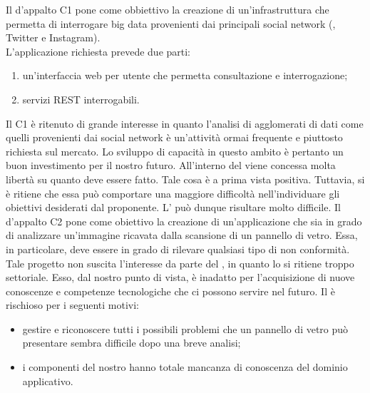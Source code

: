 			Il  d'appalto C1 pone come obbiettivo la creazione di un'infrastruttura che permetta di interrogare big data provenienti dai principali social network (, Twitter e Instagram).\\
			L'applicazione richiesta prevede due parti:
			\begin{enumerate}
				\item un'interfaccia web per utente che permetta consultazione e interrogazione;
				\item servizi REST interrogabili.
			\end{enumerate}
			Il  C1 è ritenuto di grande interesse in quanto l'analisi di agglomerati di dati come quelli provenienti dai social network è un'attività ormai frequente e piuttosto richiesta sul mercato. Lo sviluppo di capacità in questo ambito è pertanto un buon investimento per il nostro futuro.
		All'interno del  viene concessa molta libertà su quanto deve essere fatto. Tale cosa è a prima vista positiva. Tuttavia, si è ritiene che essa può comportare una maggiore difficoltà nell'individuare gli obiettivi desiderati dal proponente. L' può dunque risultare molto difficile.
			Il  d'appalto C2 pone come obiettivo la creazione di un'applicazione che sia in grado di analizzare un'immagine ricavata dalla scansione di un pannello di vetro. Essa, in particolare, deve essere in grado di rilevare qualsiasi tipo di non conformità.
			Tale progetto non suscita l'interesse da parte del , in quanto lo si ritiene troppo settoriale. Esso, dal nostro punto di vista, è inadatto per l'acquisizione di nuove conoscenze e competenze tecnologiche che ci possono servire nel futuro.
			Il  è rischioso per i seguenti motivi:
			\begin{itemize}
				\item gestire e riconoscere tutti i possibili problemi che un pannello di vetro può presentare sembra difficile dopo una breve analisi;
				\item i componenti del nostro  hanno totale mancanza di conoscenza del dominio applicativo.
			\end{itemize}
